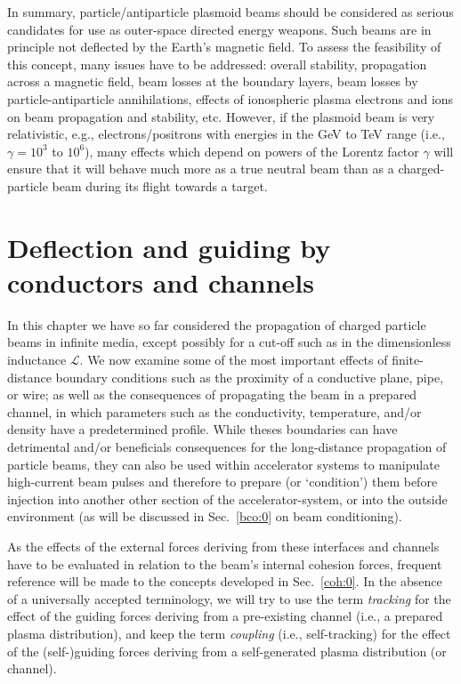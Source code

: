 \documentclass [12pt,a4paper,     ]{report} %
\begin{document}
In summary, particle/antiparticle plasmoid beams should be considered as serious candidates for use as outer-space directed energy weapons.  Such beams are in principle not deflected by the Earth's magnetic field.  To assess the feasibility of this concept, many issues have to be addressed: overall stability, propagation across a magnetic field, beam losses at the boundary layers, beam losses by particle-antiparticle annihilations, effects of ionospheric plasma electrons and ions on beam propagation and stability, etc.  However, if the plasmoid beam is very relativistic, e.g., electrons/positrons with energies in the GeV to TeV range (i.e., $\gamma = 10^3$ to $10^6$), many effects which depend on powers of the Lorentz factor $\gamma$  will ensure that it will behave much more as a true neutral beam than as a charged-particle beam during its flight towards a target.



\section{Deflection and guiding by conductors and channels}
\label{dgc:0}

   In this chapter we have so far considered the propagation of charged particle beams in infinite media, except possibly for a cut-off such as in the dimensionless inductance $\mathcal{L}$.  We now examine some of the most important effects of finite-distance boundary conditions such as the proximity of a conductive plane, pipe, or wire; as well as the consequences of propagating the beam in a prepared channel, in which parameters such as the conductivity, temperature, and/or density have a predetermined profile.  While theses boundaries can have detrimental and/or beneficials consequences for the long-distance propagation of particle beams, they can also be used within accelerator systems to manipulate high-current beam pulses and therefore to prepare (or `condition') them before injection into another other section of the accelerator-system, or into the outside environment (as will be discussed in Sec.~\ref{bco:0} on beam conditioning).

   As the effects of the external forces deriving from these interfaces and channels have to be evaluated in relation to the beam's internal cohesion forces, frequent reference will be made to the concepts developed in Sec.~\ref{coh:0}.  In the absence of a universally accepted terminology, we will try to use the term \emph{tracking} for the effect of the guiding forces deriving from a pre-existing channel (i.e., a prepared plasma distribution), and keep the term \emph{coupling} (i.e., self-tracking) for the effect of the (self-)guiding forces deriving from a self-generated plasma distribution (or channel).
\end{document}
